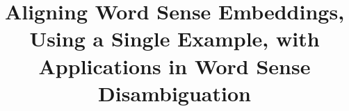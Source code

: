 \documentclass{sig-alternate-05-2015}
\begin{document}
\title{Aligning Word Sense Embeddings, Using a Single Example, with Applications in Word Sense Disambiguation}
\end{document}
